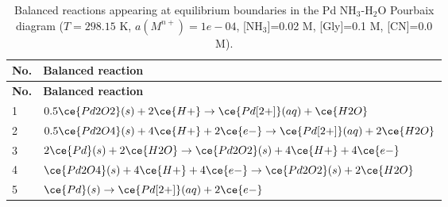 \begin{longtable}{|p{0.9cm}|p{13.3cm}|}
\caption{Balanced reactions appearing at equilibrium boundaries in the Pd NH$_3$-H$_2$O Pourbaix diagram ($T=298.15$ K, $a(M^{n+})=1e-04$, [NH$_3$]=0.02 M, [Gly]=0.1 M, [CN]=0.0 M).}\\
\hline
\textbf{No.} & \textbf{Balanced reaction} \\ \hline
\endfirsthead
\hline
\textbf{No.} & \textbf{Balanced reaction} \\ \hline
\endhead
1 & $0.5 \ce{Pd2O2}(s) + 2 \ce{H+} \rightarrow \ce{Pd[2+]}(aq) + \ce{H2O}$ \\ \hline
2 & $0.5 \ce{Pd2O4}(s) + 4 \ce{H+} + 2 \ce{e-} \rightarrow \ce{Pd[2+]}(aq) + 2 \ce{H2O}$ \\ \hline
3 & $2 \ce{Pd}(s) + 2 \ce{H2O} \rightarrow \ce{Pd2O2}(s) + 4 \ce{H+} + 4 \ce{e-}$ \\ \hline
4 & $\ce{Pd2O4}(s) + 4 \ce{H+} + 4 \ce{e-} \rightarrow \ce{Pd2O2}(s) + 2 \ce{H2O}$ \\ \hline
5 & $\ce{Pd}(s) \rightarrow \ce{Pd[2+]}(aq) + 2 \ce{e-}$ \\ \hline
\end{longtable}
